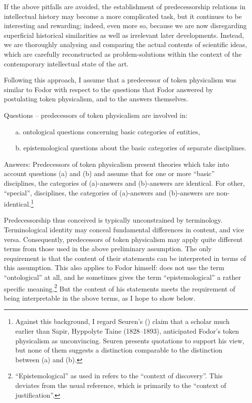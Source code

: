 \documentclass[output=paper]{langscibook}
\begin{document}
If the above pitfalls are avoided, the establishment of predecessorship relations in intellectual history may become a more complicated task, but it continues to be interesting and rewarding; indeed, even more so, because we are now disregarding superficial historical similarities as well as irrelevant later developments. Instead, we are thoroughly analysing and comparing the actual contents of scientific ideas, which are carefully reconstructed as problem-solutions within the context of the contemporary intellectual state of the art.

Following this approach, I assume that a predecessor of token physicalism was similar to Fodor with respect to the questions that Fodor answered by postulating token physicalism, and to the answers themselves.

Questions -- predecessors of token physicalism are involved in:

\begin{enumerate}
    \item[a.] ontological questions concerning basic categories of entities,
    \item[b.] epistemological questions about the basic categories of separate disciplines.
\end{enumerate}

Answers: Predecessors of token physicalism present theories which take into account questions (a) and (b) and assume that for one or more ``basic'' disciplines, the categories of (a)-answers and (b)-answers are identical. For other, ``special'', disciplines, the categories of (a)-answers and (b)-answers are non-identical.\footnote{Against this background, I regard Seuren's (\citeyear[827--832]{Seuren2016}) claim that a scholar much earlier than Sapir, Hyppolyte Taine (1828--1893), anticipated Fodor's token physicalism as unconvincing. Seuren presents quotations to support his view, but none of them suggests a distinction comparable to the distinction between (a) and (b).}

Predecessorship thus conceived is typically unconstrained by terminology. Terminological identity may conceal fundamental differences in content, and vice versa. Consequently, predecessors of token physicalism may apply quite different terms from those used in the above preliminary assumption. The only requirement is that the content of their statements can be interpreted in terms of this assumption. This also applies to Fodor himself: \citet{Fodor1974} does not use the term ``ontological'' at all, and he sometimes gives the term ``epistemological'' a rather specific meaning.\footnote{``Epistemological'' as used in \citet[113]{Fodor1974} refers to the ``context of discovery''. This deviates from the usual reference, which is primarily to the ``context of justification''.\label{fn:elffers:6}} But the content of his statements meets the requirement of being interpretable in the above terms, as I hope to show below.
\end{document}
